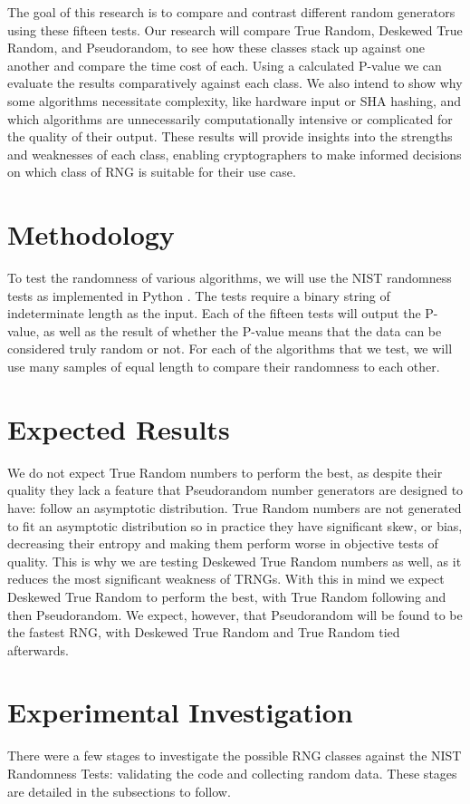 \documentclass[11pt,letterpaper,conference]{IEEEtran}
\begin{document}
The goal of this research is to compare and contrast different random generators using these fifteen tests.
Our research will compare True Random, Deskewed True Random, and Pseudorandom, to see how these classes
stack up against one another and compare the time cost of each. Using a calculated P-value we can evaluate
the results comparatively against each class. We also intend to show why some algorithms
necessitate complexity, like hardware input or SHA hashing, and which algorithms are unnecessarily
computationally intensive or complicated for the quality of their output. These results will provide
insights into the strengths and weaknesses of each class, enabling cryptographers to make informed decisions
on which class of RNG is suitable for their use case.

\section{Methodology}
To test the randomness of various algorithms, we will use the NIST randomness tests as
implemented in Python \cite{rtestsuite}. The tests require a binary string of indeterminate length as the input.
Each of the fifteen tests will output the P-value, as well as the result of whether the P-value means
that the data can be considered truly random or not. For each of the algorithms that we test, we
will use many samples of equal length to compare their randomness to each other.

\section{Expected Results}
We do not expect True Random numbers to perform the best, as despite their quality they lack a feature that
Pseudorandom number generators are designed to have: follow an asymptotic distribution. True Random numbers
are not generated to fit an asymptotic distribution so in practice they have significant skew, or bias, decreasing their
entropy and making them perform worse in objective tests of quality. This is why we are testing Deskewed True
Random numbers as well, as it reduces the most significant weakness of TRNGs. With this in mind we expect Deskewed True
Random to perform the best, with True Random following and then Pseudorandom. We expect, however, that Pseudorandom
will be found to be the fastest RNG, with Deskewed True Random and True Random tied afterwards.

\section{Experimental Investigation}
There were a few stages to investigate the possible RNG classes against the NIST Randomness Tests: validating the code and collecting random data. These stages are detailed in the subsections to follow.
\end{document}
